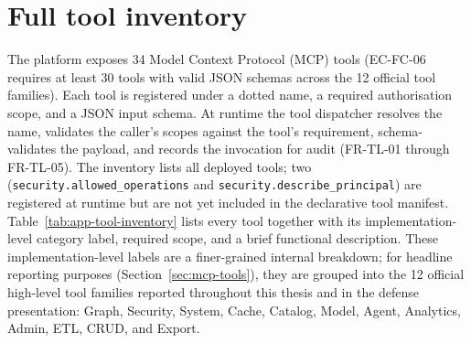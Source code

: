 \documentclass[a4paper,noexaminfo]{sapthesis}
\newcommand{\CategoryCount}{12}
\begin{document}
\section{Full tool inventory}
\label{app:tool-inventory}

The platform exposes 34 Model Context Protocol (MCP) tools (EC-FC-06
requires at least 30 tools with valid JSON schemas across the 12
official tool families).  Each tool is registered under a
dotted name, a required authorisation scope, and a JSON input schema.
At runtime the tool dispatcher resolves the name, validates the
caller's scopes against the tool's requirement, schema-validates the
payload, and records the invocation for audit (FR-TL-01 through
FR-TL-05).  The inventory lists all deployed tools; two
(\texttt{security.allowed\_operations} and
\texttt{security.describe\_principal}) are registered at runtime
but are not yet included in the declarative tool manifest.
Table~\ref{tab:app-tool-inventory} lists every tool together with its
implementation-level category label, required scope, and a brief
functional description.  These implementation-level labels are a
finer-grained internal breakdown; for headline reporting purposes
(Section~\ref{sec:mcp-tools}), they are grouped into the \CategoryCount{}
official high-level tool families reported throughout this thesis and in
the defense presentation: Graph, Security, System, Cache, Catalog, Model,
Agent, Analytics, Admin, ETL, CRUD, and Export.
\end{document}
